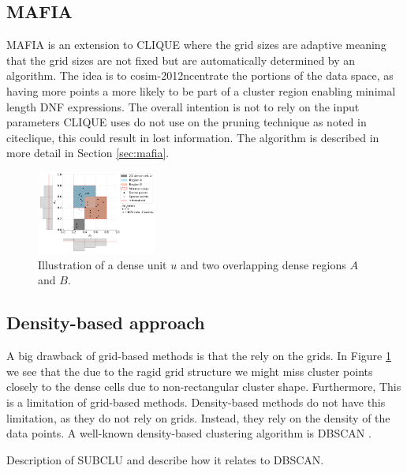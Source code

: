 \subsection{MAFIA}
MAFIA is an extension to CLIQUE where the grid sizes are adaptive meaning that the grid sizes are not fixed but are automatically determined by an algorithm. The idea is to cosim-2012ncentrate the portions of the data space, as having more points a more likely to be part of a cluster region enabling minimal length DNF expressions. The overall intention is not to rely on the input parameters CLIQUE uses do not use on the pruning technique as noted in cite{clique}, this could result in lost information. The algorithm is described in more detail in Section \ref{sec:mafia}.
\begin{figure}[H]
    \vspace*{-0.5cm}
    \centering
    \includegraphics[width=0.35\textwidth]{figures/dense_cells_and_regions.png}
    \caption{Illustration of a dense unit $u$ and two overlapping dense regions $A$ and $B$.}
    \label{fig:dense_cells_and_regions}
    \vspace*{-0.5cm}
\end{figure}

\subsection{Density-based approach}
A big drawback of grid-based methods is that the rely on the grids. In Figure \ref{fig:dense_cells_and_regions} we see that the due to the ragid grid structure we might miss cluster points closely to the dense cells due to non-rectangular cluster shape. Furthermore, This is a limitation of grid-based methods. Density-based methods do not have this limitation, as they do not rely on grids. Instead, they rely on the density of the data points. A well-known density-based clustering algorithm is DBSCAN \cite{dbscan}.


Description of SUBCLU and describe how it relates to DBSCAN.